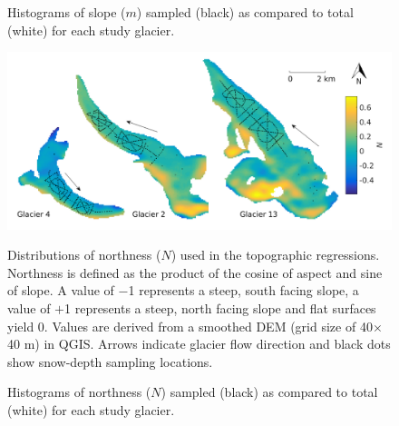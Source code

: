 \documentclass{sfuthesis}
\newcommand{\topomap}{Arrows indicate glacier flow direction and black dots show snow-depth sampling locations. }
\begin{document}
\begin{figure}[H]
	\caption[Histograms of full and sampled slope ($m$)]{Histograms of slope ($m$) sampled (black) as compared to total (white) for each study glacier.}
	\label{sampledRange:slope}
\end{figure}

\begin{figure}[H]
	\centering
	\includegraphics[width=\textwidth]{Map_northness.png}\\
	\caption[Distributions of northness ($N$)]{Distributions of northness ($N$) used in the topographic regressions. Northness is defined as the product of the cosine of aspect and sine of slope. A value of $-$1 represents a steep, south facing slope, a value of $+$1 represents a steep, north facing slope and flat surfaces yield 0. Values are derived from a smoothed DEM (grid size of 40$\times$40 m) in QGIS. \topomap}
	\label{map:northness}
\end{figure}

\begin{figure}[H]
	\caption[Histograms of full and sampled northness ($N$)]{Histograms of northness ($N$) sampled (black) as compared to total (white) for each study glacier.}
	\label{sampledRange:northness}
\end{figure}
\end{document}
